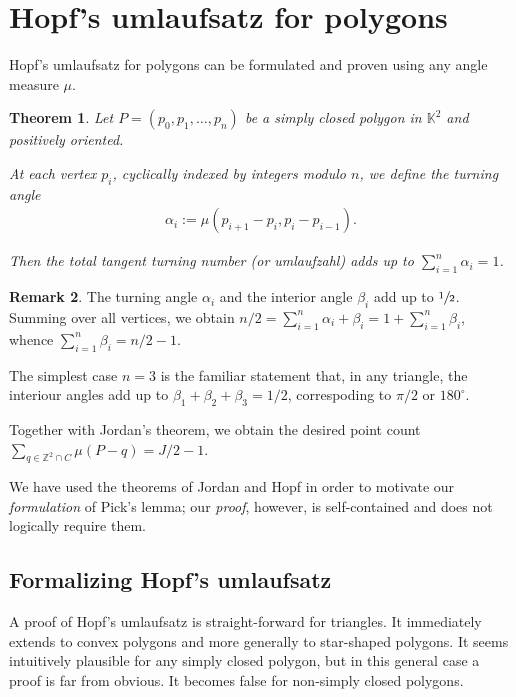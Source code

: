 \documentclass[a4paper]{amsart}
\numberwithin{equation}{section}
\theoremstyle{plain}
\newtheorem{theorem}{Theorem}[section]
\theoremstyle{definition}
\newtheorem{remark}[theorem]{Remark}
\newcommand{\Z}{\mathbb{Z}}
\newcommand{\K}{\mathbb{K}}
\begin{document}
\setcounter{section}{7}
\section{Hopf's umlaufsatz for polygons}

Hopf's umlaufsatz for polygons can be formulated
and proven using any angle measure $\mu$.

\begin{theorem}
  Let $P = (p_0,p_1,\ldots,p_n)$ be a simply closed
  polygon in $\K^2$ and positively oriented.
  
  At each vertex $p_i$, cyclically indexed
  by integers modulo $n$, we define the turning angle
  \begin{align*}
    \alpha_i := \mu(p_{i+1}-p_i, p_i-p_{i-1}) .
  \end{align*}

  Then the total tangent turning number (or umlaufzahl)
  adds up to $\sum_{i=1}^n \alpha_i = 1$.
\end{theorem}

\begin{remark}
  The turning angle $\alpha_i$ and the interior angle $\beta_i$
  add up to $\sfrac{1}{2}$.  Summing over all vertices, we obtain
  $n/2 = \sum_{i=1}^n \alpha_i + \beta_i = 1 + \sum_{i=1}^n \beta_i$,
  whence $\sum_{i=1}^n \beta_i = n/2 - 1$.

  The simplest case $n=3$ is the familiar statement that,
  in any triangle, the interiour angles add up
  to $\beta_1 + \beta_2 + \beta_3 = 1/2$,
  correspoding to $\pi/2$ or $180^\circ$.
\end{remark}

Together with Jordan's theorem, we obtain the desired
point count $\sum_{q \in \Z^2 \cap C} \mu(P-q) = J/2 - 1$.

We have used the theorems of Jordan and Hopf in order
to motivate our \emph{formulation} of Pick's lemma;
our \emph{proof}, however, is self-contained and
does not logically require them.


\subsection{Formalizing Hopf's umlaufsatz}

A proof of Hopf's umlaufsatz is straight-forward for triangles.
It immediately extends to convex polygons and
more generally to star-shaped polygons.
It seems intuitively plausible for any simply closed polygon,
but in this general case a proof is far from obvious.
It becomes false for non-simply closed polygons.
\end{document}
